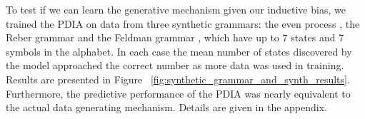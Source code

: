 To test if we can learn the generative mechanism given our inductive bias, we trained the PDIA on data from three synthetic grammars: the even process \cite{Shalizi2004}, the Reber grammar \cite{Reber1967} and the Feldman grammar \cite{Feldman1966}, which have up to 7 states and 7 symbols in the alphabet.  In each case the mean number of states discovered by the model approached the correct number as more data was used in training.  Results are presented in Figure~ \ref{fig:synthetic_grammar_and_synth_results}.  Furthermore, the predictive performance of the PDIA was nearly equivalent to the actual data generating mechanism.  Details are given in the appendix.
%
\begin{figure}[htbp]
\centering
{} \hspace{-.55cm} 
  \hspace{-1.25cm} 
 \\

\end{figure}
